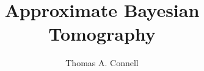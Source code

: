 \documentclass[mres, greychapternumbers]{mqthesis}
\begin{document}
\frontmatter

\title{Approximate Bayesian Tomography} %
\author{Thomas A. Connell} %

\titlepage


\tableofcontents 
\listoffigures
\listoftables

\mainmatter

\makeatletter
\let\old@makechapterhead\@makechapterhead
\makeatletter
\def\thickhrulefill{\leavevmode \leaders \hrule height 1ex \hfill \kern \z@}
\def\@makechapterhead#1{%
  {\parindent \z@ \raggedright
    \reset@font
    \hrule
    \vspace*{10\p@}%
    \par
    \iftoggle{smallcapschapter}{  %
   	 \Large \sc \@chapapp{} \Huge\bfseries \thechapter
	}{
	\Large \@chapapp{} \Huge\bfseries \thechapter
	}
    \par\nobreak
    \vspace*{10\p@}%
    \hrule
    \par
    \vspace*{1\p@}%
    \hrule
    \vspace*{20\p@}
    \Huge \bfseries #1\par\nobreak
    \vskip 70\p@
  }}


\end{document}
